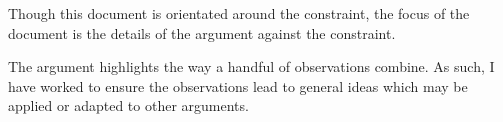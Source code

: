 \begin{note}
  Though this document is orientated around the constraint, the focus of the document is the details of the argument against the constraint.

  The argument highlights the way a handful of observations combine.
  As such, I have worked to ensure the observations lead to general ideas which may be applied or adapted to other arguments.
\end{note}



